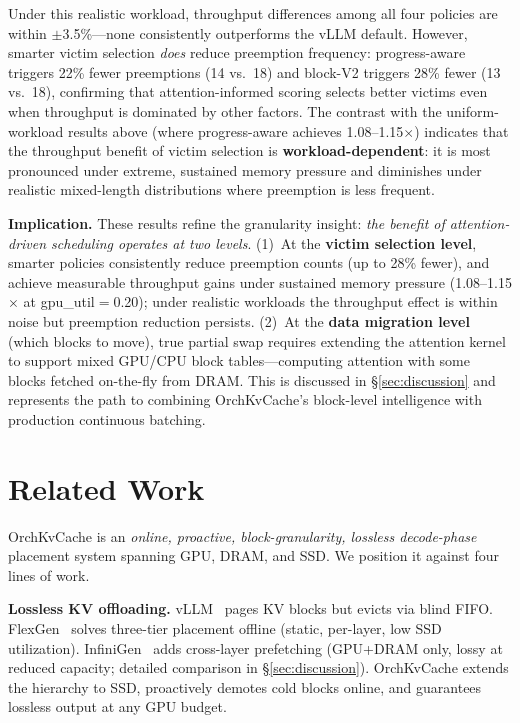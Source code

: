 \documentclass[conference]{IEEEtran}
\begin{document}
Under this realistic workload, throughput differences among all four policies are within $\pm$3.5\%---none consistently outperforms the vLLM default. However, smarter victim selection \emph{does} reduce preemption frequency: progress-aware triggers 22\% fewer preemptions (14 vs.\ 18) and block-V2 triggers 28\% fewer (13 vs.\ 18), confirming that attention-informed scoring selects better victims even when throughput is dominated by other factors. The contrast with the uniform-workload results above (where progress-aware achieves 1.08--1.15$\times$) indicates that the throughput benefit of victim selection is \textbf{workload-dependent}: it is most pronounced under extreme, sustained memory pressure and diminishes under realistic mixed-length distributions where preemption is less frequent.

\textbf{Implication.} These results refine the granularity insight: \emph{the benefit of attention-driven scheduling operates at two levels}. (1)~At the \textbf{victim selection level}, smarter policies consistently reduce preemption counts (up to 28\% fewer), and achieve measurable throughput gains under sustained memory pressure (1.08--1.15$\times$ at gpu\_util$=$0.20); under realistic workloads the throughput effect is within noise but preemption reduction persists. (2)~At the \textbf{data migration level} (which blocks to move), true partial swap requires extending the attention kernel to support mixed GPU/CPU block tables---computing attention with some blocks fetched on-the-fly from DRAM. This is discussed in \S\ref{sec:discussion} and represents the path to combining OrchKvCache's block-level intelligence with production continuous batching.



\section{Related Work}

OrchKvCache is an \emph{online, proactive, block-granularity, lossless decode-phase} placement system spanning GPU, DRAM, and SSD. We position it against four lines of work.

\textbf{Lossless KV offloading.}
vLLM~\cite{vllm} pages KV blocks but evicts via blind FIFO. FlexGen~\cite{flexgen} solves three-tier placement offline (static, per-layer, low SSD utilization). InfiniGen~\cite{infinigen} adds cross-layer prefetching (GPU+DRAM only, lossy at reduced capacity; detailed comparison in \S\ref{sec:discussion}). OrchKvCache extends the hierarchy to SSD, proactively demotes cold blocks online, and guarantees lossless output at any GPU budget.
\end{document}
